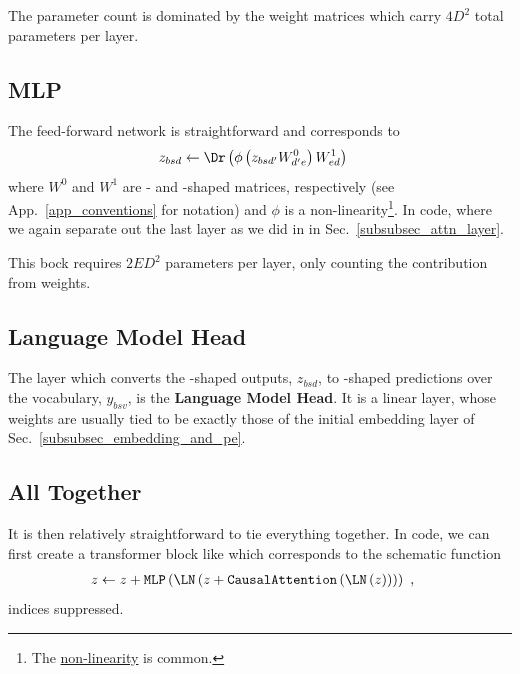 \documentclass[11pt]{article}
\begin{document}
The parameter count is dominated by the weight matrices which carry $ 4 D ^{ 2 } $ total parameters
per layer.


\subsection{MLP \label{subsubsec_mlp} }

The feed-forward network is straightforward and corresponds to
\begin{align}
	z _{ bsd } & \leftarrow \Dr \left (\phi \left ( z _{ bsd' }W ^{ 0 }_{ d'e } \right ) W ^{ 1 } _{ ed
	} \right ) \label{eq_mlp}
\end{align}
where $ W ^{ 0 } $ and $ W ^{ 1 } $ are - and -shaped matrices,
respectively (see App.~\ref{app_conventions} for notation) and $ \phi $ is a
non-linearity\footnote{The 
	\href{https://pytorch.org/docs/stable/generated/torch.nn.GELU.html}{non-linearity} is common.}.
In code, where we again separate out the last  layer as we did in in
Sec.~\ref{subsubsec_attn_layer}.  

This bock requires $ 2 E D ^{ 2 } $ parameters per layer, only counting the contribution from
weights.


\subsection{Language Model Head \label{subsubsec_language_model_head} }


The layer which converts the -shaped outputs, $ z _{ bsd } $, to -shaped
predictions over the vocabulary, $  y _{ bsv } $, is the \textbf{Language Model Head}. It
is a linear layer, whose weights are usually tied to be exactly those of the initial embedding
layer of Sec.~\ref{subsubsec_embedding_and_pe}.


\subsection{All Together}
It is then relatively straightforward to tie everything together.  In code, we can first create a
transformer block like
which corresponds to the schematic function
\begin{align}
	z & \leftarrow  z + \texttt{MLP}\left ( \LN \left ( z + \texttt{CausalAttention}\left ( \LN \left (
				z\right ) \right )  \right ) \right )\ ,
\end{align}
indices suppressed.
\end{document}
